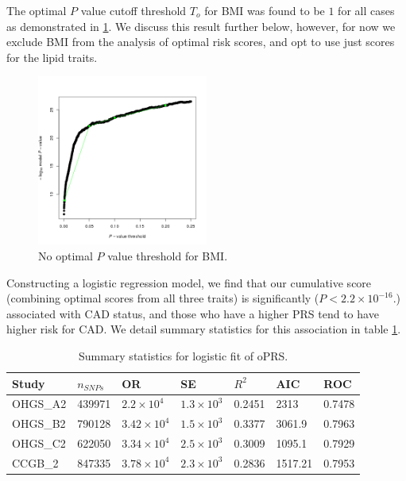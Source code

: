 The optimal $P$ value cutoff threshold $T_o$ for \ac{BMI} was found to be $1$ for all cases as demonstrated in \ref{oprs_bmi}. We discuss this result further below, however, for now we exclude \ac{BMI} from the analysis of optimal risk scores, and opt to use just scores for the lipid traits.

\begin{figure}[H]
\label{oprs_bmi}
\caption{No optimal $P$ value threshold for \ac{BMI}.}
\centering
\includegraphics[width=0.5\textwidth]{Figures/PRSice_HIGH-RES_PLOT_2016-04-23.png}
\end{figure}

Constructing a logistic regression model, we find that our cumulative score (combining optimal scores from all three traits) is significantly ($P < 2.2 \times 10^{-16}$.) associated with \ac{CAD} status, and those who have a higher \ac{PRS} tend to have higher risk for \ac{CAD}. We detail summary statistics for this association in table \ref{oprs_ss}. 



\begin{table}[H]
\centering
\caption{Summary statistics for logistic fit of \ac{oPRS}.}
\label{oprs_ss}
\begin{tabular}{lllllll}
\hline
Study & $n_{SNPs}$ & OR         & SE      & $R^2$     & AIC     & ROC    \\ \hline
OHGS\_A2 & 439971 & $2.2\times10^4$  & $1.3\times10^3$ & 0.2451 & 2313    & 0.7478 \\
OHGS\_B2 & 790128 & $3.42\times10^4$ & $1.5\times10^3$ & 0.3377 & 3061.9  & 0.7963 \\
OHGS\_C2 & 622050 & $3.34\times10^4$ & $2.5\times10^3$ & 0.3009 & 1095.1  & 0.7929 \\
CCGB\_2 & 847335 & $3.78\times10^4$ & $2.3\times10^3$ & 0.2836 & 1517.21 & 0.7953 \\ \hline
\end{tabular}
\end{table}

